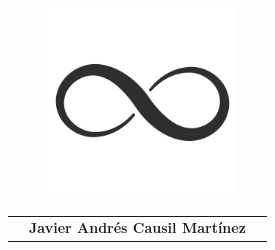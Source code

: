 \thispagestyle{empty}   %
\begin{center}

    \vspace*{1cm}
    
    \begin{figure}
      \raggedleft
      \begin{minipage}{4cm}
      \includegraphics[width=5cm]{images/Logo.png}
      \end{minipage}
    \end{figure}
    
    \vspace*{2cm}
    
    \vspace*{0.1in}
    
    \begin{spacing}{1.7}
    
    \begin{tabular}{p{4cm} ll}
    
    & \textbf{\huge Javier Andr\'es Causil Mart\'inez}\\ %


\end{tabular}
\end{spacing}
\end{center}
